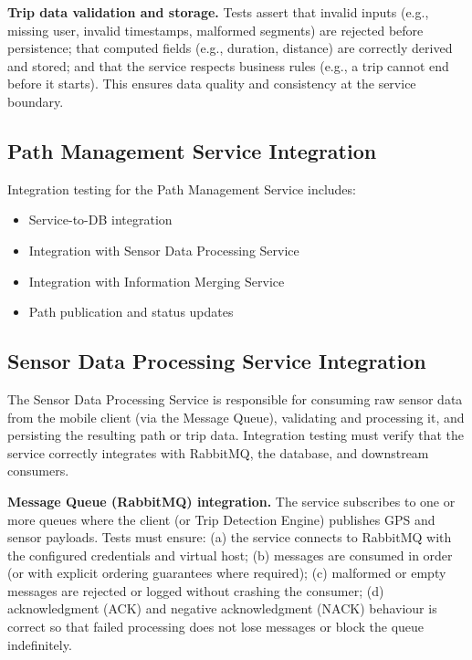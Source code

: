 \textbf{Trip data validation and storage.} Tests assert that invalid inputs (e.g., missing user, invalid timestamps, malformed segments) are rejected before persistence; that computed fields (e.g., duration, distance) are correctly derived and stored; and that the service respects business rules (e.g., a trip cannot end before it starts). This ensures data quality and consistency at the service boundary.

\subsection{Path Management Service Integration}
\label{subsec:path_management_service_integration}%

Integration testing for the Path Management Service includes:
\begin{itemize}
    \item Service-to-DB integration
    \item Integration with Sensor Data Processing Service
    \item Integration with Information Merging Service
    \item Path publication and status updates
\end{itemize}

\subsection{Sensor Data Processing Service Integration}
\label{subsec:sensor_data_processing_service_integration}%

The Sensor Data Processing Service is responsible for consuming raw sensor data from the mobile client (via the Message Queue), validating and processing it, and persisting the resulting path or trip data. Integration testing must verify that the service correctly integrates with RabbitMQ, the database, and downstream consumers.

\textbf{Message Queue (RabbitMQ) integration.}
The service subscribes to one or more queues where the client (or Trip Detection Engine) publishes GPS and sensor payloads. Tests must ensure: (a) the service connects to RabbitMQ with the configured credentials and virtual host; (b) messages are consumed in order (or with explicit ordering guarantees where required); (c) malformed or empty messages are rejected or logged without crashing the consumer; (d) acknowledgment (ACK) and negative acknowledgment (NACK) behaviour is correct so that failed processing does not lose messages or block the queue indefinitely.

